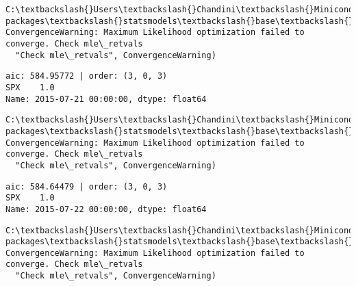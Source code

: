 \documentclass[11pt]{article}
\begin{document}
    \begin{Verbatim}[commandchars=\\\{\}]
C:\textbackslash{}Users\textbackslash{}Chandini\textbackslash{}Miniconda3\textbackslash{}envs\textbackslash{}auquan\textbackslash{}lib\textbackslash{}site-packages\textbackslash{}statsmodels\textbackslash{}base\textbackslash{}model.py:496: ConvergenceWarning: Maximum Likelihood optimization failed to converge. Check mle\_retvals
  "Check mle\_retvals", ConvergenceWarning)

    \end{Verbatim}

    \begin{Verbatim}[commandchars=\\\{\}]
aic: 584.95772 | order: (3, 0, 3)
SPX    1.0
Name: 2015-07-21 00:00:00, dtype: float64

    \end{Verbatim}

    \begin{Verbatim}[commandchars=\\\{\}]
C:\textbackslash{}Users\textbackslash{}Chandini\textbackslash{}Miniconda3\textbackslash{}envs\textbackslash{}auquan\textbackslash{}lib\textbackslash{}site-packages\textbackslash{}statsmodels\textbackslash{}base\textbackslash{}model.py:496: ConvergenceWarning: Maximum Likelihood optimization failed to converge. Check mle\_retvals
  "Check mle\_retvals", ConvergenceWarning)

    \end{Verbatim}

    \begin{Verbatim}[commandchars=\\\{\}]
aic: 584.64479 | order: (3, 0, 3)
SPX    1.0
Name: 2015-07-22 00:00:00, dtype: float64

    \end{Verbatim}

    \begin{Verbatim}[commandchars=\\\{\}]
C:\textbackslash{}Users\textbackslash{}Chandini\textbackslash{}Miniconda3\textbackslash{}envs\textbackslash{}auquan\textbackslash{}lib\textbackslash{}site-packages\textbackslash{}statsmodels\textbackslash{}base\textbackslash{}model.py:496: ConvergenceWarning: Maximum Likelihood optimization failed to converge. Check mle\_retvals
  "Check mle\_retvals", ConvergenceWarning)

    \end{Verbatim}
\end{document}
